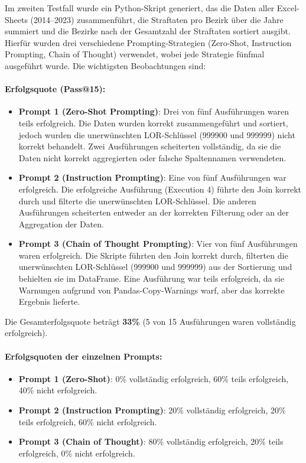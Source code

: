 \documentclass[11pt,a4paper]{article}
\begin{document}
Im zweiten Testfall wurde ein Python-Skript generiert, das die Daten aller Excel-Sheets (2014--2023) zusammenführt, die Straftaten pro Bezirk über die Jahre summiert und die Bezirke nach der Gesamtzahl der Straftaten sortiert ausgibt. Hierfür wurden drei verschiedene Prompting-Strategien (Zero-Shot, Instruction Prompting, Chain of Thought) verwendet, wobei jede Strategie fünfmal ausgeführt wurde. Die wichtigsten Beobachtungen sind:

\paragraph{Erfolgsquote (Pass@15):}
\begin{itemize}
    \item \textbf{Prompt 1 (Zero-Shot Prompting)}: Drei von fünf Ausführungen waren teils erfolgreich. Die Daten wurden korrekt zusammengeführt und sortiert, jedoch wurden die unerwünschten LOR-Schlüssel (999900 und 999999) nicht korrekt behandelt. Zwei Ausführungen scheiterten vollständig, da sie die Daten nicht korrekt aggregierten oder falsche Spaltennamen verwendeten.
    \item \textbf{Prompt 2 (Instruction Prompting)}: Eine von fünf Ausführungen war erfolgreich. Die erfolgreiche Ausführung (Execution 4) führte den Join korrekt durch und filterte die unerwünschten LOR-Schlüssel. Die anderen Ausführungen scheiterten entweder an der korrekten Filterung oder an der Aggregation der Daten.
    \item \textbf{Prompt 3 (Chain of Thought Prompting)}: Vier von fünf Ausführungen waren erfolgreich. Die Skripte führten den Join korrekt durch, filterten die unerwünschten LOR-Schlüssel (999900 und 999999) aus der Sortierung und behielten sie im DataFrame. Eine Ausführung war teils erfolgreich, da sie Warnungen aufgrund von Pandas-Copy-Warnings warf, aber das korrekte Ergebnis lieferte.
\end{itemize}
Die Gesamterfolgsquote beträgt \textbf{33\%} (5 von 15 Ausführungen waren vollständig erfolgreich).
\paragraph{Erfolgsquoten der einzelnen Prompts:}
\begin{itemize}
    \item \textbf{Prompt 1 (Zero-Shot)}: 0\% vollständig erfolgreich, 60\% teils erfolgreich, 40\% nicht erfolgreich.
    \item \textbf{Prompt 2 (Instruction Prompting)}: 20\% vollständig erfolgreich, 20\% teils erfolgreich, 60\% nicht erfolgreich.
    \item \textbf{Prompt 3 (Chain of Thought)}: 80\% vollständig erfolgreich, 20\% teils erfolgreich, 0\% nicht erfolgreich.
\end{itemize}
\end{document}
